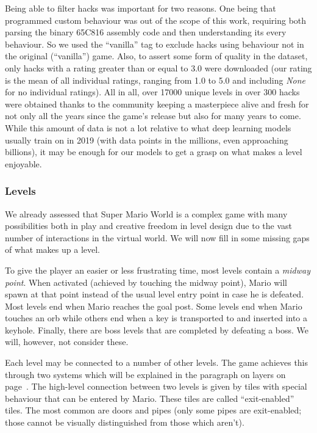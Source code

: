 Being able to filter hacks was important for two reasons. One being
that programmed custom behaviour was out of the scope of this work,
requiring both parsing the binary 65C816 assembly code and then
understanding its every behaviour. So we used the ``vanilla'' tag to
exclude hacks using behaviour not in the original (``vanilla'') game.
Also, to assert some form of quality in the dataset, only hacks with a
rating greater than or equal to 3.0 were downloaded (our rating is the
mean of all individual ratings, ranging from 1.0 to 5.0 and including
\emph{None} for no individual ratings). All in all, over 17000 unique
levels in over 300 hacks were obtained thanks to the community keeping
a masterpiece alive and fresh for not only all the years since the
game's release but also for many years to come. While this amount of
data is not a lot relative to what deep learning models usually train
on in 2019 (with data points in the millions, even approaching
billions), it may be enough for our models to get a grasp on what
makes a level enjoyable.

\subsubsection{Levels}

We already assessed that Super Mario World is a complex game with many
possibilities both in play and creative freedom in level design due to
the vast number of interactions in the virtual world. We will now fill
in some missing gaps of what makes up a level.

To give the player an easier or less frustrating time, most levels
contain a \emph{midway point}. When activated (achieved by touching
the midway point), Mario will spawn at that point instead of the usual
level entry point in case he is defeated. Most levels end when Mario
reaches the goal post. Some levels end when Mario touches an orb while
others end when a key is transported to and inserted into a keyhole.
Finally, there are boss levels that are completed by defeating a boss.
We will, however, not consider these.

Each level may be connected to a number of other levels. The game
achieves this through two systems which will be explained in the
paragraph on layers on page~\pageref{par:layers}. The high-level
connection between two levels is given by tiles with special behaviour
that can be entered by Mario. These tiles are called ``exit-enabled''
tiles. The most common are doors and pipes (only some pipes are
exit-enabled; those cannot be visually distinguished from those which
aren't).

